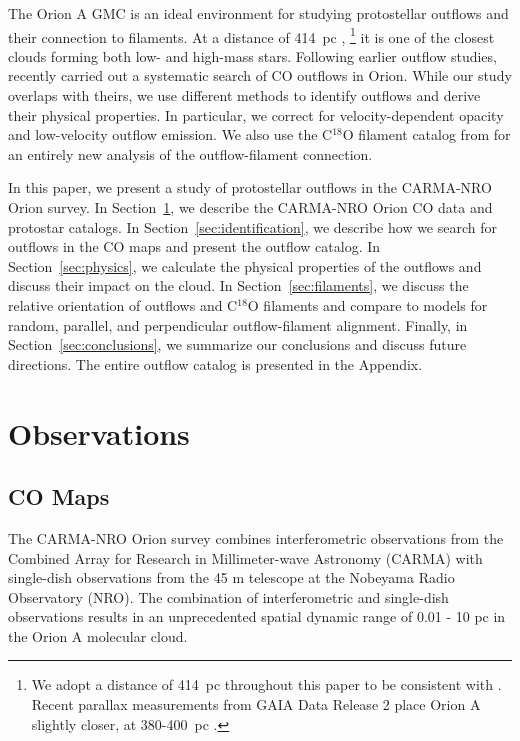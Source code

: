 \documentclass[twocolumn]{aastex63}
\begin{document}
The Orion A GMC is an ideal environment for studying protostellar outflows and their connection to filaments. At a distance of 414~pc \citep{Menten07}, \footnote{We adopt a distance of 414~pc throughout this paper to be consistent with \citet{Tanabe:submitted}. Recent parallax measurements from GAIA Data Release 2 place Orion A slightly closer, at 380-400~pc \citep{Kounkel18,Grossschedl18,Kuhn19}.} it is one of the closest clouds forming both low- and high-mass stars. Following earlier outflow studies, \citet{Tanabe:submitted} recently carried out a systematic search of CO outflows in Orion. While our study overlaps with theirs, we use different methods to identify outflows and derive their physical properties. In particular, we correct for velocity-dependent opacity and low-velocity outflow emission. We also use the C$^{18}$O filament catalog from \citet{Suri19} for an entirely new analysis of the outflow-filament connection.

In this paper, we present a study of protostellar outflows in the CARMA-NRO Orion survey. In Section~\ref{sec:observations}, we describe the CARMA-NRO Orion CO data and protostar catalogs. In Section~\ref{sec:identification}, we describe how we search for outflows in the CO maps and present the outflow catalog. In Section~\ref{sec:physics}, we calculate the physical properties of the outflows and discuss their impact on the cloud. In Section~\ref{sec:filaments}, we discuss the relative orientation of outflows and C$^{18}$O filaments and compare to models for random, parallel, and perpendicular outflow-filament alignment. Finally, in Section~\ref{sec:conclusions}, we summarize our conclusions and discuss future directions. The entire outflow catalog is presented in the Appendix.


\section{Observations}\label{sec:observations}

\subsection{CO Maps}
The CARMA-NRO Orion survey combines interferometric observations from the Combined Array for Research in Millimeter-wave Astronomy (CARMA) with single-dish observations from the 45 m telescope at the Nobeyama Radio Observatory (NRO). The combination of interferometric and single-dish observations results in an unprecedented spatial dynamic range of 0.01 - 10 pc in the Orion A molecular cloud.
\end{document}
